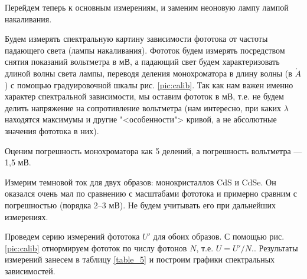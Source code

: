 \documentclass[12pt]{kiarticle} %
\newcommand{\an}{\ensuremath{\mathring{A}}}
\begin{document}
	Перейдем теперь к основным измерениям, и заменим неоновую лампу лампой накаливания.
	
	Будем измерять спектральную картину зависимости фототока от частоты падающего света (лампы накаливания). Фототок будем измерять посредством снятия показаний вольтметра в мВ, а падающий свет будем характеризовать длиной волны света лампы, переводя деления монохроматора в длину волны (в $ \an $) с помощью градуировочной шкалы рис. \ref{pic:calib}. Так как нам важен именно характер спектральной зависимости, мы оставим фототок в мВ, т.е. не будем делить напряжение на сопротивление вольтметра (нам интересно, при каких $ \lambda $ находятся максимумы и другие "<особенности"> кривой, а не абсолютные значения фототока в них).
	
	Оценим погрешность монохроматора как 5 делений, а погрешность вольтметра --- 1,5 мВ.

	Измерим темновой ток для двух образов: монокристаллов CdS и CdSe. Он оказался очень мал по сравнению с масштабами фототока и примерно сравним с погрешностью (порядка 2--3 мВ). Не будем учитывать его при дальнейших измерениях.
	
	Проведем серию измерений фототока $ U' $ для обоих образов. С помощью рис. \ref{pic:calib} отнормируем фототок по числу фотонов $ N $, т.е. $ U = U'/N. $. Результаты измерений занесем в таблицу \ref{table_5} и построим графики спектральных зависимостей.
	
\end{document}
